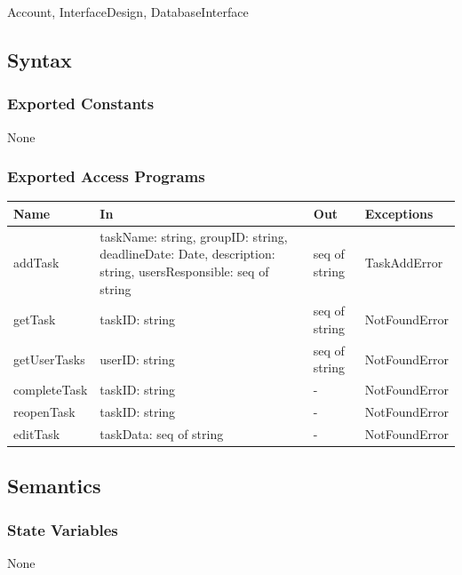 \documentclass[12pt, titlepage]{article}
\begin{document}
Account, InterfaceDesign, DatabaseInterface

\subsection{Syntax}

\subsubsection{Exported Constants}

None

\subsubsection{Exported Access Programs}

\begin{center}
\begin{tabular}{p{3cm} p{5cm} p{2cm} p{4.5cm}}
\hline
\textbf{Name} & \textbf{In} & \textbf{Out} & \textbf{Exceptions} \\
\hline
addTask & taskName: string, groupID: string, deadlineDate: Date, description: string, usersResponsible: seq of string  & seq of string & TaskAddError \\
\hline
getTask & taskID: string & seq of string  & NotFoundError \\
\hline
getUserTasks & userID: string & seq of string  & NotFoundError \\
\hline
completeTask & taskID: string & -  &  NotFoundError \\
\hline
reopenTask & taskID: string & - & NotFoundError \\
\hline
editTask & taskData: seq of string & - & NotFoundError \\
\hline
\end{tabular}
\end{center}

\subsection{Semantics}

\subsubsection{State Variables}

None


\end{document}
